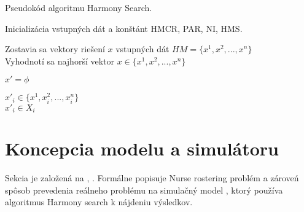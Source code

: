 \documentclass[a4paper, 14pt]{article}
\begin{document}
\begin{algorithm}[H]
\caption{Pseudokód algoritmu Harmony Search.}
\label{alg1}
\SetNlSty{}{}{:} 
\SetNlSkip{-1.2em}
\SetInd{1em}{1em}

\BlankLine
{}
\BlankLine
\Indp \Indp
	Inicializácia vstupných dát a konštánt HMCR, PAR, NI, HMS.\\
\BlankLine

\Indm \Indm
{}
\BlankLine
\Indp \Indp
	Zostavia sa vektory riešení $x$ vstupných dát $HM = \{x^1,x^2,..., x^n\}$\\
	Vyhodnotí sa najhorší vektor $x \in  \{x^1,x^2,..., x^n\}$\\
\BlankLine

\Indm \Indm
{}
\BlankLine
\Indp \Indp
	$x' = \phi$\\
    {
    	
    	{
			$x'_i \in  \{x^1,x_i^2,..., x_i^n\}$\\
		}			
		{
			$x'_i \in  X_i$\\
							    			
		}
		
    }
\BlankLine

\Indm \Indm
{}
\BlankLine
\Indp \Indp
\BlankLine

\Indm \Indm
{}
\BlankLine
\Indp \Indp
\BlankLine
\end{algorithm}



\section{Koncepcia modelu a simulátoru}
Sekcia je založená na \cite{MainArticle}, \cite{MathArticle}. Formálne popisuje Nurse rostering problém a zároveń spôsob prevedenia reálneho problému na simulačný model \cite{Peringer}, ktorý používa algoritmus Harmony search k nájdeniu výsledkov.
\end{document}
